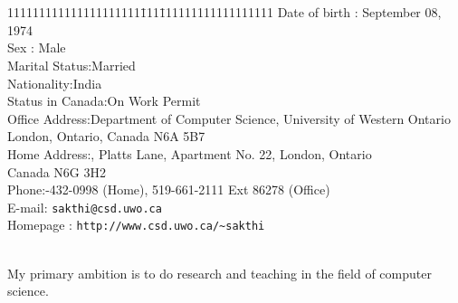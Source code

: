\documentclass[11pt]{article}
\begin{document}
\thispagestyle{empty}
 \ \\\\
\begin{tabbing}111111111111111111111\=111\=111111111111111111 \kill
Date of birth \>:\> September 08, 1974\\
Sex \>:\> Male\\
Marital Status\>:\>Married\\
Nationality\>:\>India\\
Status in Canada\>:\>On Work Permit\\
Office Address\>:\>Department of Computer Science, University of
Western Ontario\\
\>\> London, Ontario, Canada N6A 5B7\\
Home Address\>:, Platts Lane, Apartment No. 22, London, Ontario\\
\>\> Canada N6G 3H2\\
Phone\>:-432-0998 (Home), 519-661-2111 Ext 86278 (Office)\\
E-mail\>:\> \verb+sakthi@csd.uwo.ca+\\
Homepage \>:\> \verb+http://www.csd.uwo.ca/~sakthi+ 
\end{tabbing}

\vspace{0.3cm}

\\

My primary ambition is to do research and teaching in the field of computer science. 

\vspace{0.3cm}
\end{document}

